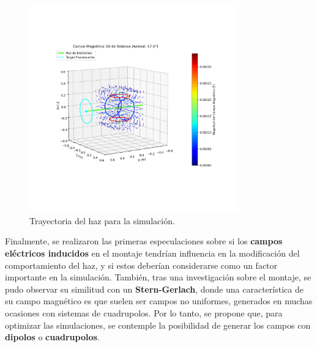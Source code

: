 \begin{figure}[H]
    \centering
    \includegraphics[width=0.8\textwidth]{Sections/Figures/frame_azim_057.6.png}
    \caption{Trayectoria del haz para la simulación.}
    \label{fig:trayectoria_haz_simulacion}
\end{figure}

Finalmente, se realizaron las primeras especulaciones sobre si los \textbf{campos eléctricos inducidos} en el montaje tendrían influencia en la modificación del comportamiento del haz, y si estos deberían considerarse como un factor importante en la simulación. También, tras una investigación sobre el montaje, se pudo observar su similitud con un \textbf{Stern-Gerlach}, donde una característica de su campo magnético es que suelen ser campos no uniformes, generados en muchas ocasiones con sistemas de cuadrupolos. Por lo tanto, se propone que, para optimizar las simulaciones, se contemple la posibilidad de generar los campos con \textbf{dipolos} o \textbf{cuadrupolos}.